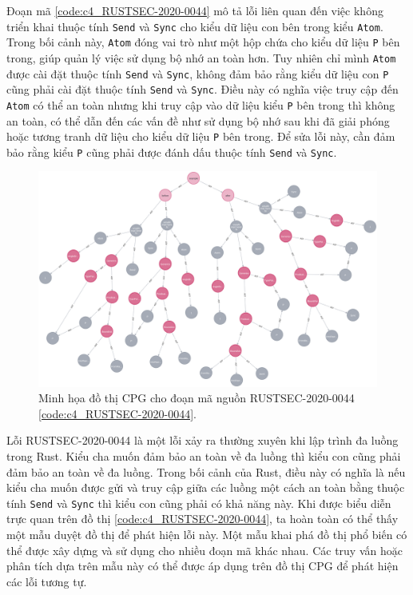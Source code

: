 Đoạn mã \ref{code:c4_RUSTSEC-2020-0044} mô tả lỗi liên quan đến việc không triển khai thuộc tính \texttt{Send} và \texttt{Sync} cho kiểu dữ liệu con bên trong kiểu \texttt{Atom}.
Trong bối cảnh này, \texttt{Atom} đóng vai trò như một hộp chứa cho kiểu dữ liệu \texttt{P} bên trong, giúp quản lý việc sử dụng bộ nhớ an toàn hơn.
Tuy nhiên chỉ mình \texttt{Atom} được cài đặt thuộc tính \texttt{Send} và \texttt{Sync}, không đảm bảo rằng kiểu dữ liệu con \texttt{P} cũng phải cài đặt thuộc tính \texttt{Send} và \texttt{Sync}.
Điều này có nghĩa việc truy cập đến \texttt{Atom} có thể an toàn nhưng khi truy cập vào dữ liệu kiểu \texttt{P} bên trong thì không an toàn, có thể dẫn đến các vấn đề như sử dụng bộ nhớ sau khi đã giải phóng hoặc tương tranh dữ liệu cho kiểu dữ liệu \texttt{P} bên trong.
Để sửa lỗi này, cần đảm bảo rằng kiểu \texttt{P} cũng phải được đánh dấu thuộc tính \texttt{Send} và \texttt{Sync}.

\begin{figure}[H]
    \includegraphics[width=1\columnwidth]{figures/c4/c4_RUSTSEC-2020-0044.png}
    \centering
    \caption{Minh họa đồ thị CPG cho đoạn mã nguồn RUSTSEC-2020-0044 \ref{code:c4_RUSTSEC-2020-0044}.}
    \label{img:c4_RUSTSEC-2020-0044}
\end{figure}

Lỗi RUSTSEC-2020-0044 là một lỗi xảy ra thường xuyên khi lập trình đa luồng trong Rust.
Kiểu cha muốn đảm bảo an toàn về đa luồng thì kiểu con cũng phải đảm bảo an toàn về đa luồng.
Trong bối cảnh của Rust, điều này có nghĩa là nếu kiểu cha muốn được gửi và truy cập giữa các luồng một cách an toàn bằng thuộc tính \texttt{Send} và \texttt{Sync} thì kiểu con cũng phải có khả năng này.
Khi được biểu diễn trực quan trên đồ thị \ref{code:c4_RUSTSEC-2020-0044}, ta hoàn toàn có thể thấy một mẫu duyệt đồ thị để phát hiện lỗi này.
Một mẫu khai phá đồ thị phổ biến có thể được xây dựng và sử dụng cho nhiều đoạn mã khác nhau.
Các truy vấn hoặc phân tích dựa trên mẫu này có thể được áp dụng trên đồ thị CPG để phát hiện các lỗi tương tự.

